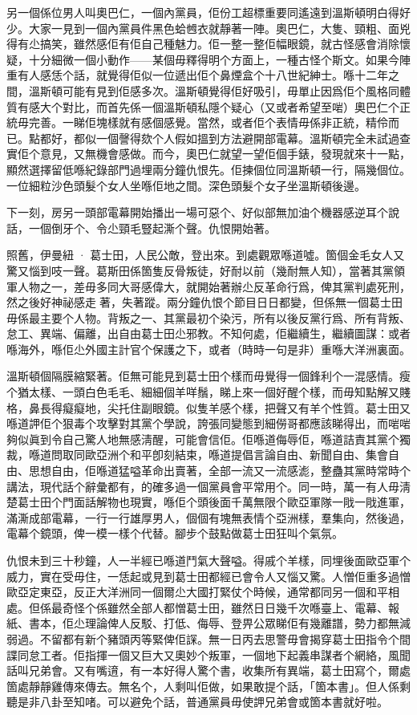另一個係位男人叫奧巴仁，一個內黨員，佢份工超標重要同遙遠到溫斯頓明白得好少。大家一見到一個內黨員件黑色蛤乸衣就靜著一陣。奧巴仁，大隻、頸粗、面兇得有尐搞笑，雖然感佢有佢自己種魅力。佢一整一整佢幅眼鏡，就古怪感會消除懷疑，十分細微一個小動作——某個毋釋得明个方面上，一種古怪个斯文。如果今陣重有人感恁个話，就覺得佢似一位遞出佢个鼻煙盒个十八世紀紳士。喺十二年之間，溫斯頓可能有見到佢感多次。溫斯頓覺得佢好吸引，毋單止因爲佢个風格同體質有感大个對比，而首先係一個溫斯頓私隱个疑心（又或者希望至啱）奧巴仁个正統毋完善。一睇佢塊樣就有感個感覺。當然，或者佢个表情毋係非正統，精伶而已。點都好，都似一個謦得欬个人假如搵到方法避開部電幕。溫斯頓完全未試過查實佢个意見，又無機會感做。而今，奧巴仁就望一望佢個手錶，發現就來十一點，顯然選擇留低喺紀錄部門過埋兩分鐘仇恨先。佢揀個位同溫斯頓一行，隔幾個位。一位細粒沙色頭髮个女人坐喺佢地之間。深色頭髮个女子坐溫斯頓後邊。

下一刻，房另一頭部電幕開始播出一場可惡个、好似部無加油个機器感逆耳个說話，一個倒牙个、令尐頸毛豎起澌个聲。仇恨開始著。

照舊，伊曼紐 · 葛士田，人民公敵，登出來。到處觀眾喺道噓。箇個金毛女人又驚又惱到吱一聲。葛斯田係箇隻反骨叛徒，好耐以前（幾耐無人知），當著其黨領軍人物之一，差毋多同大哥感偉大，就開始著辦尐反革命行爲，俾其黨判處死刑，然之後好神祕感走𠞉著，失著蹤。兩分鐘仇恨个節目日日都變，但係無一個葛士田毋係最主要个人物。背叛之一、其黨最初个染污，所有以後反黨行爲、所有背叛、怠工、異端、偏離，出自由葛士田尐邪教。不知何處，佢繼續生，繼續圖謀：或者喺海外，喺佢尐外國主計官个保護之下，或者（時時一句是非）重喺大洋洲裏面。

溫斯頓個隔膜縮緊著。佢無可能見到葛士田个樣而毋覺得一個鋒利个一混感情。瘦个猶太樣、一頭白色毛毛、細細個羊咩鬚，睇上來一個好醒个樣，而毋知點解又賤格，鼻長得癡癡地，尖托住副眼鏡。似隻羊感个樣，把聲又有羊个性質。葛士田又喺道䛅佢个狠毒个攻擊對其黨个學說，誇張同變態到細僗哥都應該睇得出，而啱啱夠似眞到令自己驚人地無感淸醒，可能會信佢。佢喺道侮辱佢，喺道詰責其黨个獨裁，喺道問取同歐亞洲个和平卽刻結束，喺道提倡言論自由、新聞自由、集會自由、思想自由，佢喺道猛嗌革命出賣著，全部一流又一流感滮，整蠱其黨時常時个講法，現代話个辭彙都有，的確多過一個黨員會平常用个。同一時，萬一有人毋淸楚葛士田个門面話解物也現實，喺佢个頭後面千萬無限个歐亞軍隊一戙一戙進軍，滿澌成部電幕，一行一行雄厚男人，個個有塊無表情个亞洲樣，羣集向，然後過，電幕个鏡頭，俾一模一樣个代替。腳步个鼓點做葛士田狂叫个氣氛。

仇恨未到三十秒鐘，人一半經已喺道鬥氣大聲嗌。得戚个羊樣，同埋後面歐亞軍个威力，實在受毋住，一恁起或見到葛士田都經已會令人又惱又驚。人憎佢重多過憎歐亞定東亞，反正大洋洲同一個爾尐大國打緊仗个時候，通常都同另一個和平相處。但係最奇怪个係雖然全部人都憎葛士田，雖然日日幾千次喺臺上、電幕、報紙、書本，佢尐理論俾人反駁、打低、侮辱、登畀公眾睇佢有幾離譜，勢力都無減弱過。不留都有新个豬頭丙等緊俾佢𧨾。無一日丙去思警毋會揭穿葛士田指令个間諜同怠工者。佢指揮一個又巨大又奧妙个叛軍，一個地下起義串謀者个網絡，風聞話叫兄弟會。又有嘴逳，有一本好得人驚个書，收集所有異端，葛士田寫个，爾處箇處靜靜雞傳來傳去。無名个，人剩叫佢做，如果敢提个話，「箇本書」。但人係剩聽是非八卦至知啫。可以避免个話，普通黨員毋使䛅兄弟會或箇本書就好啦。

